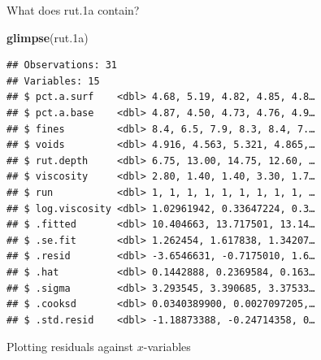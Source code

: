 \documentclass[ignorenonframetext,]{beamer}
\newenvironment{Shaded}{\begin{snugshade}}{\end{snugshade}}
\newcommand{\DataTypeTok}[1]{\textcolor[rgb]{0.13,0.29,0.53}{#1}}
\newcommand{\FloatTok}[1]{\textcolor[rgb]{0.00,0.00,0.81}{#1}}
\newcommand{\KeywordTok}[1]{\textcolor[rgb]{0.13,0.29,0.53}{\textbf{#1}}}
\newcommand{\NormalTok}[1]{#1}
\newcommand{\OperatorTok}[1]{\textcolor[rgb]{0.81,0.36,0.00}{\textbf{#1}}}
\newcommand{\StringTok}[1]{\textcolor[rgb]{0.31,0.60,0.02}{#1}}
\begin{document}
\begin{frame}[fragile]{What does rut.1a contain?}
\protect\hypertarget{what-does-rut.1a-contain}{}

\begin{Shaded}
\begin{Highlighting}[]
\KeywordTok{glimpse}\NormalTok{(rut}\FloatTok{.1}\NormalTok{a)}
\end{Highlighting}
\end{Shaded}

\begin{verbatim}
## Observations: 31
## Variables: 15
## $ pct.a.surf    <dbl> 4.68, 5.19, 4.82, 4.85, 4.8…
## $ pct.a.base    <dbl> 4.87, 4.50, 4.73, 4.76, 4.9…
## $ fines         <dbl> 8.4, 6.5, 7.9, 8.3, 8.4, 7.…
## $ voids         <dbl> 4.916, 4.563, 5.321, 4.865,…
## $ rut.depth     <dbl> 6.75, 13.00, 14.75, 12.60, …
## $ viscosity     <dbl> 2.80, 1.40, 1.40, 3.30, 1.7…
## $ run           <dbl> 1, 1, 1, 1, 1, 1, 1, 1, 1, …
## $ log.viscosity <dbl> 1.02961942, 0.33647224, 0.3…
## $ .fitted       <dbl> 10.404663, 13.717501, 13.14…
## $ .se.fit       <dbl> 1.262454, 1.617838, 1.34207…
## $ .resid        <dbl> -3.6546631, -0.7175010, 1.6…
## $ .hat          <dbl> 0.1442888, 0.2369584, 0.163…
## $ .sigma        <dbl> 3.293545, 3.390685, 3.37533…
## $ .cooksd       <dbl> 0.0340389900, 0.0027097205,…
## $ .std.resid    <dbl> -1.18873388, -0.24714358, 0…
\end{verbatim}

\end{frame}

\begin{frame}[fragile]{Plotting residuals against \(x\)-variables}
\protect\hypertarget{plotting-residuals-against-x-variables-1}{}

\begin{Shaded}
\end{Shaded}

\end{frame}
\end{document}

